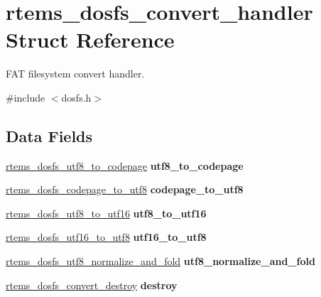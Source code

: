 \hypertarget{structrtems__dosfs__convert__handler}{}\section{rtems\+\_\+dosfs\+\_\+convert\+\_\+handler Struct Reference}
\label{structrtems__dosfs__convert__handler}


F\+AT filesystem convert handler.  




{\ttfamily \#include $<$dosfs.\+h$>$}

\subsection*{Data Fields}
\begin{DoxyCompactItemize}
\item 
\mbox{\label{structrtems__dosfs__convert__handler_a9a288cf6498af9e99ed1a4502880cabd}} 
\mbox{\hyperlink{dosfs_8h_abe2a0ddc21aef4050b25dd06f60adbd3}{rtems\+\_\+dosfs\+\_\+utf8\+\_\+to\+\_\+codepage}} {\bfseries utf8\+\_\+to\+\_\+codepage}
\item 
\mbox{\label{structrtems__dosfs__convert__handler_a0e36cdd9babc87a7100fb0da6c7ff86c}} 
\mbox{\hyperlink{dosfs_8h_a119bce3cbc82fe28235837d3d2e892fb}{rtems\+\_\+dosfs\+\_\+codepage\+\_\+to\+\_\+utf8}} {\bfseries codepage\+\_\+to\+\_\+utf8}
\item 
\mbox{\label{structrtems__dosfs__convert__handler_af958d78f6542746b2b8d165eeeffc7c0}} 
\mbox{\hyperlink{dosfs_8h_a37e4ab29a3cedbe4db59c630e7d6bf28}{rtems\+\_\+dosfs\+\_\+utf8\+\_\+to\+\_\+utf16}} {\bfseries utf8\+\_\+to\+\_\+utf16}
\item 
\mbox{\label{structrtems__dosfs__convert__handler_a23f0729cd794418f3cf381ade5243c50}} 
\mbox{\hyperlink{dosfs_8h_a18b1fce23a06d886f19811f365f31858}{rtems\+\_\+dosfs\+\_\+utf16\+\_\+to\+\_\+utf8}} {\bfseries utf16\+\_\+to\+\_\+utf8}
\item 
\mbox{\label{structrtems__dosfs__convert__handler_a82a53da1aab0a207e87118c61e5631c8}} 
\mbox{\hyperlink{dosfs_8h_a58a731e0d2cbb18220d0c5f70d5c2632}{rtems\+\_\+dosfs\+\_\+utf8\+\_\+normalize\+\_\+and\+\_\+fold}} {\bfseries utf8\+\_\+normalize\+\_\+and\+\_\+fold}
\item 
\mbox{\label{structrtems__dosfs__convert__handler_ad43a16cd8066ab45b6dffafc38845c45}} 
\mbox{\hyperlink{dosfs_8h_a5e43d1ba2070a2fdf5e8de0d6ae02cec}{rtems\+\_\+dosfs\+\_\+convert\+\_\+destroy}} {\bfseries destroy}
\end{DoxyCompactItemize}



